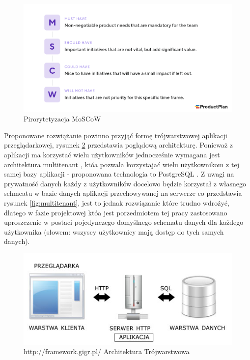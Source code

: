 \documentclass[a4paper,10pt, twoside]{report}
\begin{document}
\begin{large}
\begin{figure}[H]           %
    \centering
    \includegraphics[width=12cm]{figures/MoSCoW-01.png}
    \caption{Pirorytetyzacja MoSCoW}
    \label{fig:moscow}
\end{figure}

\medskip
{Proponowane rozwiążanie powinno przyjąć formę trójwarstwowej aplikacji 
przeglądarkowej, rysunek \ref{fig:architeturatrojwarstwowa} przedstawia 
poglądową architekturę. Ponieważ z aplikacji ma korzystać wielu użytkowników 
jednocześnie wymagana jest architektura multitenant \cite{multitenant}, któa 
pozwala korzystajać wielu użytkownikom z tej samej bazy aplikacji - proponowana 
technologia to PostgreSQL \cite{PostgreSQL}. Z uwagi na prywatność danych każdy 
z użytkowników docelowo będzie korzystał z własnego schmeatu w bazie danych 
aplikacji przechowywanej na serwerze co przedstawia rysunek 
\ref{fig:multitenant}, jest to jednak rozwiązanie które trudno wdrożyć, dlatego 
w fazie projektowej któa jest porzedmiotem tej pracy zastosowano uproszczenie w 
postaci pojedynczego domyślnego schematu danych dla każdego użytkownika 
(słowem: wszyscy użytkownicy mają dostęp do tych samych danych).}

\begin{figure}[H]           %
    \centering
    \includegraphics[width=12cm]{figures/framwork-gigr-pl_architektura_www.jpg}
    \caption{http://framework.gigr.pl/ Architektura Trójwarstwowa}
    \label{fig:architeturatrojwarstwowa}
\end{figure}


\end{large}
\end{document}
